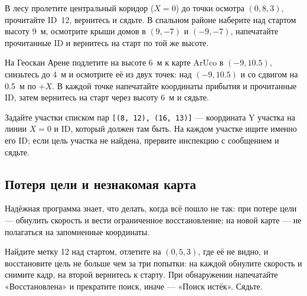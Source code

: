 \begin{taskbox}
В лесу пролетите центральный коридор ($X = 0$) до точки осмотра $(0, 8, 3)$, прочитайте ID~12, вернитесь и сядьте. В спальном районе наберите над стартом высоту 9~м, осмотрите крыши домов в $(9, -7)$ и $(-9, -7)$, напечатайте прочитанные ID и вернитесь на старт по той же высоте.
\end{taskbox}

\begin{taskbox}
На Геоскан Арене подлетите на высоте 6~м к карте ArUco в $(-9, 10.5)$, снизьтесь до 4~м и осмотрите её из двух точек: над $(-9, 10.5)$ и со сдвигом на 0.5~м по $+X$. В каждой точке напечатайте координаты прибытия и прочитанные ID, затем вернитесь на старт через высоту 6~м и сядьте.
\end{taskbox}

\begin{taskbox}
Задайте участки списком пар \verb|[(8, 12), (16, 13)]| --- координата Y участка на линии $X = 0$ и ID, который должен там быть. На каждом участке ищите именно его ID; если цель участка не найдена, прервите инспекцию с сообщением и сядьте.
\end{taskbox}

\subsection{Потеря цели и незнакомая карта}

Надёжная программа знает, что делать, когда всё пошло не так: при потере цели --- обнулить скорость и вести ограниченное восстановление; на новой карте --- не полагаться на запомненные координаты.

\begin{taskbox}
Найдите метку 12 над стартом, отлетите на $(0, 5, 3)$, где её не видно, и восстановите цель не больше чем за три попытки: на каждой обнулите скорость и снимите кадр, на второй вернитесь к старту. При обнаружении напечатайте «Восстановлена» и прекратите поиск, иначе --- «Поиск истёк». Сядьте.
\end{taskbox}

